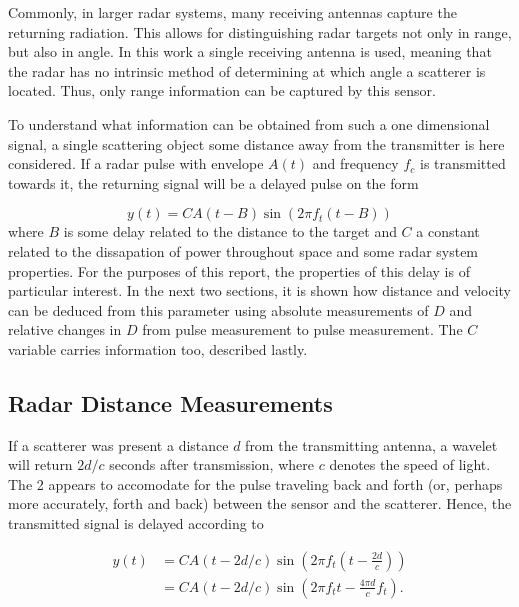 Commonly, in larger radar systems, many receiving antennas capture the returning radiation. This allows for distinguishing radar targets not only in range, but also in angle. In this work a single receiving antenna is used, meaning that the radar has no intrinsic method of determining at which angle a scatterer is located. Thus, only range information can be captured by this sensor. 

To understand what information can be obtained from such a one dimensional signal, a single scattering object some distance away from the transmitter is here considered. If a radar pulse with envelope $A(t)$ and frequency $f_c$ is transmitted towards it, the returning signal will be a delayed pulse on the form \citep{richards_2014}

\begin{equation}\label{eq:returning}
	y(t) = CA(t-B)\sin(2\pi f_t (t-B))
\end{equation}
where $B$ is some delay related to the distance to the target and $C$ a constant related to the dissapation of power throughout space and some radar system properties. For the purposes of this report, the properties of this delay is of particular interest. In the next two sections, it is shown how distance and velocity can be deduced from this parameter using absolute measurements of $D$ and relative changes in $D$ from pulse measurement to pulse measurement. The $C$ variable carries information too, described lastly. 

\subsection{Radar Distance Measurements}

If a scatterer was present a distance $d$ from the transmitting antenna, a wavelet will return $2d/c$ seconds after transmission, where $c$ denotes the speed of light. The 2 appears to accomodate for the pulse traveling back and forth (or, perhaps more accurately, forth and back) between the sensor and the scatterer. Hence, the transmitted signal is delayed according to 

\begin{equation}
	\begin{split}
		y(t) 
		& = CA(t-2d/c)\sin(2\pi f_t(t - \frac{2d}{c})) \\
		& = CA(t-2d/c)\sin(2\pi f_tt - \frac{4\pi d}{c}f_t).
	\end{split}
\end{equation}

